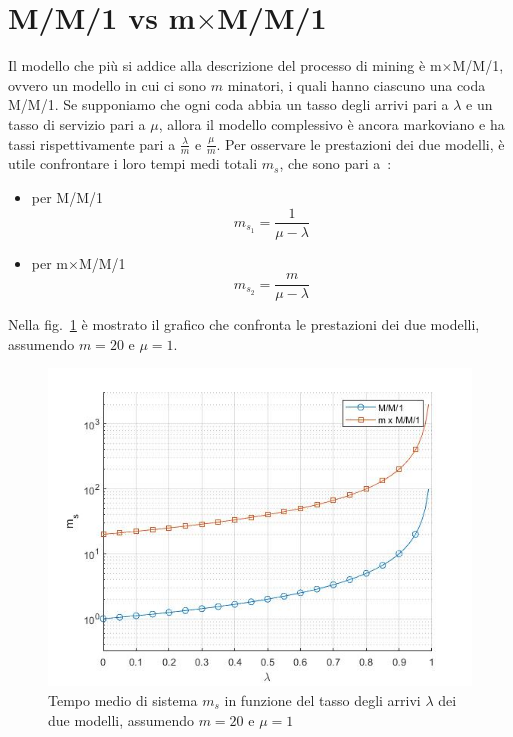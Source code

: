 \section{M/M/1 vs m$\times$M/M/1}
Il modello che più si addice alla descrizione del processo di mining \`e m$\times$M/M/1, ovvero un modello in cui ci sono $m$ minatori, i quali hanno ciascuno una coda M/M/1. Se supponiamo che ogni coda abbia un tasso degli arrivi pari a $\lambda$ e un tasso di servizio pari a $\mu$, allora il modello complessivo \`e ancora markoviano e ha tassi rispettivamente pari a $\frac{\lambda}{m}$ e $\frac{\mu}{m}$.
Per osservare le prestazioni dei due modelli, \`e utile confrontare i loro tempi medi totali $m_s$, che sono pari a~\cite[564]{libro:tele}:
\begin{itemize}
\item per M/M/1
\begin{equation}m_{s_1}=\frac{1}{\mu - \lambda}\end{equation}
\item per m$\times$M/M/1
\begin{equation}m_{s_2}=\frac{m}{\mu - \lambda}\end{equation}
\end{itemize}
Nella fig.~\ref{im:confronto} \`e mostrato il grafico che confronta le prestazioni dei due modelli, assumendo $m=20$ e $\mu=1$.
\begin{figure}
\centering 
\includegraphics[scale=0.76]{immagini/confronto} 
\caption{Tempo medio di sistema $m_s$ in funzione del tasso degli arrivi $\lambda$ dei due modelli, assumendo $m=20$ e $\mu=1$}
\label{im:confronto} 
\end{figure}
